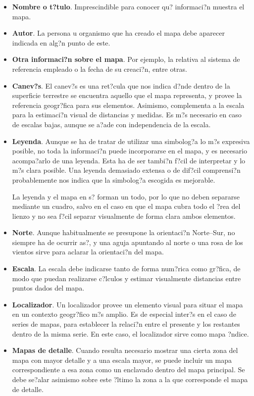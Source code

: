\begin{itemize}
\item \textbf{Nombre o t?tulo}. Imprescindible para conocer qu? informaci?n muestra el mapa.
	\item \textbf{Autor}. La persona u organismo que ha creado el mapa debe aparecer indicada en alg?n punto de este.
	\item \textbf{Otra informaci?n sobre el mapa}. Por ejemplo, la relativa al sistema de referencia empleado o la fecha de su creaci?n, entre otras.
	\item \textbf{Canev?s}. El canev?s es una ret?cula que nos indica d?nde dentro de la superficie terrestre se encuentra aquello que el mapa representa, y provee la referencia geogr?fica para sus elementos. Asimismo, complementa a la escala para la estimaci?n visual de distancias y medidas. Es m?s necesario en caso de escalas bajas, aunque se a?ade con independencia de la escala.
	\item \textbf{Leyenda}. Aunque se ha de tratar de utilizar una simbolog?a lo m?s expresiva posible, no toda la informaci?n puede incorporarse en el mapa, y es necesario acompa?arlo de una leyenda. Esta ha de ser tambi?n f?cil de interpretar y lo m?s clara posible. Una leyenda demasiado extensa o de dif?cil comprensi?n probablemente nos indica que la simbolog?a escogida es mejorable.
	
	
	La leyenda y el mapa en s? forman un todo, por lo que no deben separarse mediante un cuadro, salvo en el caso en que el mapa cubra todo el ?rea del lienzo y no sea f?cil separar visualmente de forma clara ambos elementos.
	\item \textbf{Norte}. Aunque habitualmente se presupone la orientaci?n Norte--Sur, no siempre ha de ocurrir as?, y una aguja apuntando al norte o una rosa de los vientos sirve para aclarar la orientaci?n del mapa. 
	\item \textbf{Escala}. La escala debe indicarse tanto de forma num?rica como gr?fica, de modo que puedan realizarse c?lculos y estimar visualmente distancias entre puntos dados del mapa.
	\item \textbf{Localizador}. Un localizador provee un elemento visual para situar el mapa en un contexto geogr?fico m?s amplio. Es de especial inter?s en el caso de series de mapas, para establecer la relaci?n entre el presente y los restantes dentro de la misma serie. En este caso, el localizador sirve como mapa ?ndice.
	\item \textbf{Mapas de detalle}. Cuando resulta necesario mostrar una cierta zona del mapa con mayor detalle y a una escala mayor, se puede incluir un mapa correspondiente a esa zona como un enclavado dentro del mapa principal. Se debe se?alar asimismo sobre este ?ltimo la zona a la que corresponde el mapa de detalle.
\end{itemize}



